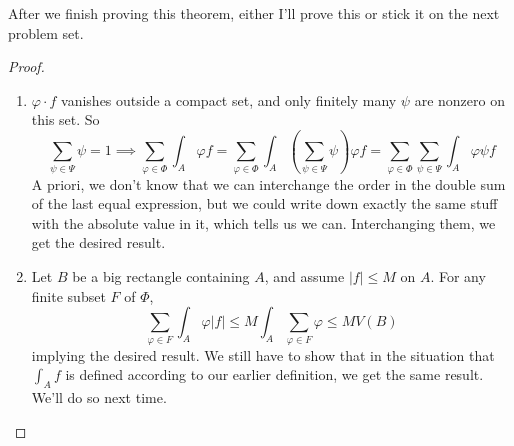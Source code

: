 \documentclass{article}
\begin{document}
After we finish proving this theorem, either I'll prove this or stick it on the next problem set.
\begin{proof}
  \begin{enumerate}

    \item \(\varphi \cdot f\) vanishes outside a compact set, and only finitely many \(\psi\) are nonzero on this set. So
    \begin{equation}
      \sum_{\psi \in \Psi}\psi = 1
      \implies \sum_{\varphi \in \Phi}\int_A\varphi f
      = \sum_{\varphi \in \Phi}\int_A\left(\sum_{\psi \in \Psi}\psi\right)\varphi f
      = \sum_{\varphi \in \Phi}\sum_{\psi \in \Psi}\int_A\varphi\psi f
    \end{equation}
    A priori, we don't know that we can interchange the order in the double sum of the last equal expression, but we could write down exactly the same stuff with the absolute value in it, which tells us we can. Interchanging them, we get the desired result.

    \item Let \(B\) be a big rectangle containing \(A\), and assume \(|f| \leq M\) on \(A\). For any finite subset \(F\) of \(\Phi\),
    \begin{equation}
      \sum_{\varphi \in F}\int_A\varphi|f| \leq M\int_A\sum_{\varphi \in F}\varphi \leq MV(B)
    \end{equation}
    implying the desired result. We still have to show that in the situation that \(\int_Af\) is defined according to our earlier definition, we get the same result. We'll do so next time.

  \end{enumerate}
\end{proof}
\end{document}
